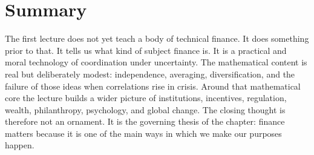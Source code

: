 \section{Summary}

The first lecture does not yet teach a body of technical finance. It does something prior to that. It tells us what kind of subject finance is. It is a practical and moral technology of coordination under uncertainty. The mathematical content is real but deliberately modest: independence, averaging, diversification, and the failure of those ideas when correlations rise in crisis. Around that mathematical core the lecture builds a wider picture of institutions, incentives, regulation, wealth, philanthropy, psychology, and global change. The closing thought is therefore not an ornament. It is the governing thesis of the chapter: finance matters because it is one of the main ways in which we make our purposes happen.
